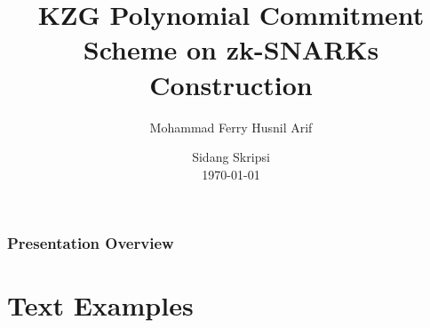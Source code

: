 \documentclass[
	11pt, %
]{beamer}
\title[KZG for zk-SNARKs]{KZG Polynomial Commitment Scheme on zk-SNARKs Construction} %
\author[Mohammad Ferry Husnil Arif]{Mohammad Ferry Husnil Arif} %
\institute[UI]{Universitas Indonesia \\ \smallskip \textit{mohammad.ferry@ui.ac.id}} %
\date[\today]{Sidang Skripsi \\ \today} %
\begin{document}

\begin{frame}
	\titlepage %
\end{frame}



\begin{frame}
	\frametitle{Presentation Overview} %
	
	\tableofcontents %
\end{frame}


\section{Text Examples} %
\end{document}
